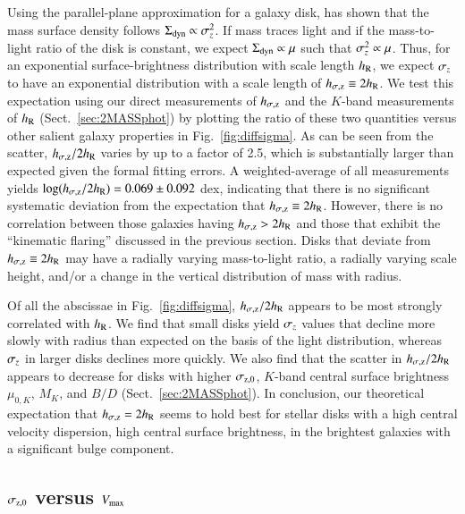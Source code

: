 \documentclass[traditabstract]{aa} %
\begin{document}
Using the parallel-plane approximation for a galaxy disk, \citet{kruit1988} has
shown that the mass surface density follows $\Sigma_{\rm dyn} \propto \sigma_z^2$.  If mass
traces light and if the mass-to-light ratio of the disk is constant, we expect
$\Sigma_{\rm dyn} \propto \mu$ such that $\sigma_z^2 \propto \mu$.  Thus, for an exponential
surface-brightness distribution with scale length $h_{\rm R}$, we expect $\sigma_z$ to
have an exponential distribution with a scale length of $h_{\sigma{\rm,z}}\equiv 2h_{\rm R}$.  We
test this expectation using our direct measurements of $h_{\sigma{\rm,z}}$ and the $K$-band
measurements of $h_{\rm R}$ (Sect.~\ref{sec:2MASSphot}) by plotting the ratio of
these two quantities versus other salient galaxy properties in
Fig.~\ref{fig:diffsigma}.  As can be seen from the scatter, $h_{\sigma{\rm,z}}/2h_{\rm R}$ varies
by up to a factor of 2.5, which is substantially larger than expected given the
formal fitting errors. 
A weighted-average of all measurements yields $\log(h_{\sigma{\rm,z}}/2h_{\rm R}) = 0.069 \pm 0.092$ dex,
indicating that there is no significant systematic deviation from the expectation that
$h_{\sigma{\rm,z}}\equiv 2h_{\rm R}$. However, there is no correlation between those galaxies having 
$h_{\sigma{\rm,z}}>2h_{\rm R}$ and those that exhibit the ``kinematic flaring'' discussed in the previous
section. Disks that deviate from $h_{\sigma{\rm,z}}\equiv 2h_{\rm R}$ may have a radially varying
mass-to-light ratio, a radially varying scale height, and/or a change in the
vertical distribution of mass with radius.

Of all the abscissae in Fig.~\ref{fig:diffsigma}, $h_{\sigma{\rm,z}}/2h_{\rm R}$ appears to be
most strongly correlated with $h_{\rm R}$.  We find that small disks yield $\sigma_z$
values that decline more slowly with radius than expected on the basis of the
light distribution, whereas $\sigma_z$ in larger disks declines more quickly.
We also find that the scatter in $h_{\sigma{\rm,z}}/2h_{\rm R}$ appears to decrease for disks with
higher $\sigma_{\rm z,0}$, $K$-band central surface brightness $\mu_{0,K}$, $M_K$,
and $B/D$ (Sect.~\ref{sec:2MASSphot}).  In conclusion, our theoretical expectation
that $h_{\sigma{\rm,z}}=2h_{\rm R}$ seems to hold best for stellar disks with a high central
velocity dispersion, high central surface brightness, in the brightest galaxies
with a significant bulge component.


\subsection{$\sigma_{\rm z,0}$ versus $V_{\rm max}$}
\label{sec:s2Vmax} 
\end{document}
